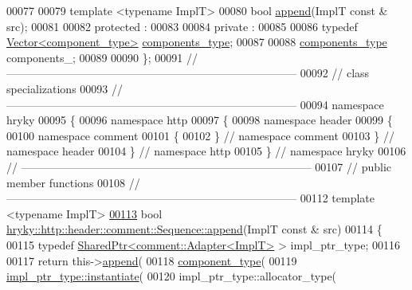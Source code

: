 \begin{DoxyCode}
00077 
00079     \textcolor{keyword}{template} <\textcolor{keyword}{typename} ImplT>
00080     \textcolor{keywordtype}{bool} \hyperlink{classhryky_1_1http_1_1header_1_1comment_1_1_sequence_a2b5373fe1ba224816e6c580acddaaf46}{append}(ImplT \textcolor{keyword}{const} & src);
00081 
00082 \textcolor{keyword}{protected} :
00083 
00084 \textcolor{keyword}{private} :
00085 
00086     \textcolor{keyword}{typedef} \hyperlink{classhryky_1_1_vector}{Vector<component_type>} \hyperlink{classhryky_1_1_vector}{components_type};
00087 
00088     \hyperlink{classhryky_1_1_vector}{components_type} components\_;
00089 
00090 \};
00091 \textcolor{comment}{//
      ------------------------------------------------------------------------------}
00092 \textcolor{comment}{// class specializations}
00093 \textcolor{comment}{//
      ------------------------------------------------------------------------------}
00094 \textcolor{keyword}{namespace }hryky
00095 \{
00096 \textcolor{keyword}{namespace }http
00097 \{
00098 \textcolor{keyword}{namespace }header
00099 \{
00100 \textcolor{keyword}{namespace }comment
00101 \{
00102 \} \textcolor{comment}{// namespace comment}
00103 \} \textcolor{comment}{// namespace header}
00104 \} \textcolor{comment}{// namespace http}
00105 \} \textcolor{comment}{// namespace hryky}
00106 \textcolor{comment}{//
      ------------------------------------------------------------------------------}
00107 \textcolor{comment}{// public member functions}
00108 \textcolor{comment}{//
      ------------------------------------------------------------------------------}
00112 \textcolor{comment}{}\textcolor{keyword}{template} <\textcolor{keyword}{typename} ImplT>
\hypertarget{http__header__comment__sequence_8h_source_l00113}{}\hyperlink{classhryky_1_1http_1_1header_1_1comment_1_1_sequence_a298f65d5f617fffc9edc2942a3044a88}{00113} \textcolor{keywordtype}{bool} \hyperlink{classhryky_1_1http_1_1header_1_1comment_1_1_sequence_a2b5373fe1ba224816e6c580acddaaf46}{hryky::http::header::comment::Sequence::append}(ImplT \textcolor{keyword}{const} & src)
00114 \{
00115     \textcolor{keyword}{typedef} \hyperlink{classhryky_1_1_shared_ptr}{SharedPtr<comment::Adapter<ImplT>} > impl\_ptr\_type;
00116     
00117     \textcolor{keywordflow}{return} this->\hyperlink{classhryky_1_1http_1_1header_1_1comment_1_1_sequence_a2b5373fe1ba224816e6c580acddaaf46}{append}(
00118         \hyperlink{classhryky_1_1_shared_ptr}{component_type}(
00119             \hyperlink{namespacehryky_a7e731db6d90571cf1aea6e113d43b6ad}{impl_ptr_type::instantiate}(
00120                 impl\_ptr\_type::allocator\_type(

\end{DoxyCode}
